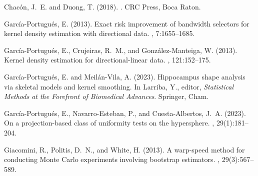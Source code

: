 \documentclass[oneside,11pt]{article}
\begin{document}
%
%
%
%
\begin{thebibliography}{}

	Chac\'{o}n, J.~E. and Duong, T. (2018).
	.
	\newblock CRC Press, Boca Raton.

	Garc\'ia-Portugu\'es, E. (2013).
	\newblock Exact risk improvement of bandwidth selectors for kernel density
	estimation with directional data.
	, 7:1655--1685.

	Garc\'ia-Portugu\'es, E., Crujeiras, R.~M., and Gonz\'alez-Manteiga, W. (2013).
	\newblock Kernel density estimation for directional-linear data.
	, 121:152--175.

	Garc\'ia-Portugu\'es, E. and Meil\'an-Vila, A. (2023).
	\newblock Hippocampus shape analysis via skeletal models and kernel smoothing.
	\newblock In Larriba, Y., editor, {\em Statistical Methods at the Forefront of
		Biomedical Advances}. Springer, Cham.

	Garc\'ia-Portugu\'es, E., Navarro-Esteban, P., and Cuesta-Albertos, J.~A.
	(2023).
	\newblock On a projection-based class of uniformity tests on the hypersphere.
	, 29(1):181--204.

	Giacomini, R., Politis, D.~N., and White, H. (2013).
	\newblock A warp-speed method for conducting {M}onte {C}arlo experiments
	involving bootstrap estimators.
	, 29(3):567--589.

\end{thebibliography}

\fi
\end{document}
